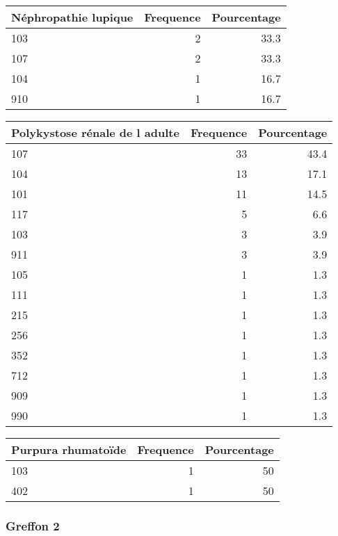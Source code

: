 \documentclass[11pt,a4paper]{article}\usepackage[]{graphicx}\usepackage[]{color}
\begin{document}
\begin{table}[H]
\centering
\begin{tabular}{lrr}
  \hline
Néphropathie lupique & Frequence & Pourcentage \\ 
  \hline
103 & 2 & 33.3 \\ 
  107 & 2 & 33.3 \\ 
  104 & 1 & 16.7 \\ 
  910 & 1 & 16.7 \\ 
   \hline
\end{tabular}
\end{table}
\begin{table}[H]
\centering
\begin{tabular}{lrr}
  \hline
Polykystose rénale de l adulte & Frequence & Pourcentage \\ 
  \hline
107 & 33 & 43.4 \\ 
  104 & 13 & 17.1 \\ 
  101 & 11 & 14.5 \\ 
  117 & 5 & 6.6 \\ 
  103 & 3 & 3.9 \\ 
  911 & 3 & 3.9 \\ 
  105 & 1 & 1.3 \\ 
  111 & 1 & 1.3 \\ 
  215 & 1 & 1.3 \\ 
  256 & 1 & 1.3 \\ 
  352 & 1 & 1.3 \\ 
  712 & 1 & 1.3 \\ 
  909 & 1 & 1.3 \\ 
  990 & 1 & 1.3 \\ 
   \hline
\end{tabular}
\end{table}
\begin{table}[H]
\centering
\begin{tabular}{lrr}
  \hline
Purpura rhumatoïde & Frequence & Pourcentage \\ 
  \hline
103 & 1 & 50 \\ 
  402 & 1 & 50 \\ 
   \hline
\end{tabular}
\end{table}


\subsubsection*{Greffon 2}
\end{document}
